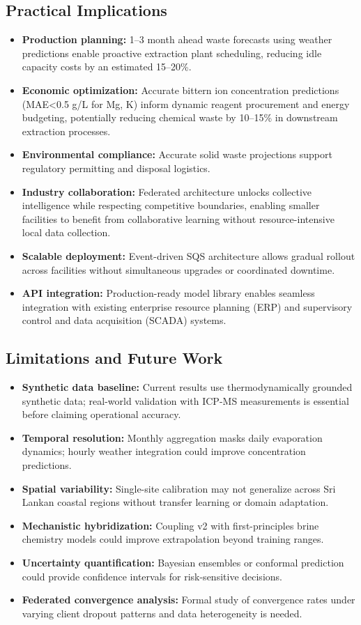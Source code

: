\documentclass[conference]{IEEEtran}
\begin{document}
\subsection{Practical Implications}
\begin{itemize}
    \item \textbf{Production planning:} 1–3 month ahead waste forecasts using weather predictions enable proactive extraction plant scheduling, reducing idle capacity costs by an estimated 15–20\%.
    \item \textbf{Economic optimization:} Accurate bittern ion concentration predictions (MAE<0.5 g/L for Mg, K) inform dynamic reagent procurement and energy budgeting, potentially reducing chemical waste by 10–15\% in downstream extraction processes.
    \item \textbf{Environmental compliance:} Accurate solid waste projections support regulatory permitting and disposal logistics.
    \item \textbf{Industry collaboration:} Federated architecture unlocks collective intelligence while respecting competitive boundaries, enabling smaller facilities to benefit from collaborative learning without resource-intensive local data collection.
    \item \textbf{Scalable deployment:} Event-driven SQS architecture allows gradual rollout across facilities without simultaneous upgrades or coordinated downtime.
    \item \textbf{API integration:} Production-ready model library enables seamless integration with existing enterprise resource planning (ERP) and supervisory control and data acquisition (SCADA) systems.
\end{itemize}

\subsection{Limitations and Future Work}
\begin{itemize}
    \item \textbf{Synthetic data baseline:} Current results use thermodynamically grounded synthetic data; real-world validation with ICP-MS measurements is essential before claiming operational accuracy.
    \item \textbf{Temporal resolution:} Monthly aggregation masks daily evaporation dynamics; hourly weather integration could improve concentration predictions.
    \item \textbf{Spatial variability:} Single-site calibration may not generalize across Sri Lankan coastal regions without transfer learning or domain adaptation.
    \item \textbf{Mechanistic hybridization:} Coupling v2 with first-principles brine chemistry models could improve extrapolation beyond training ranges.
    \item \textbf{Uncertainty quantification:} Bayesian ensembles or conformal prediction could provide confidence intervals for risk-sensitive decisions.
    \item \textbf{Federated convergence analysis:} Formal study of convergence rates under varying client dropout patterns and data heterogeneity is needed.
\end{itemize}
\end{document}
